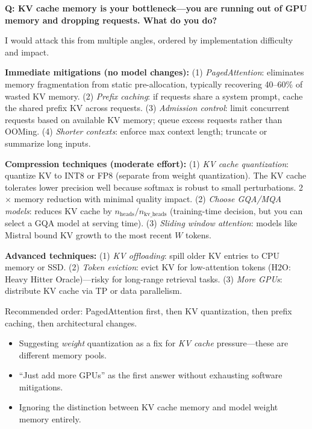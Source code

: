 \begin{interviewq}
\textbf{Q: KV cache memory is your bottleneck---you are running out of GPU memory and dropping requests. What do you do?}

 \quad {} \quad \badgefreq{\freqhigh}

\stronganswer

I would attack this from multiple angles, ordered by implementation difficulty and impact.

\textbf{Immediate mitigations (no model changes):} (1) \textit{PagedAttention}: eliminates memory fragmentation from static pre-allocation, typically recovering 40--60\% of wasted KV memory. (2) \textit{Prefix caching}: if requests share a system prompt, cache the shared prefix KV across requests. (3) \textit{Admission control}: limit concurrent requests based on available KV memory; queue excess requests rather than OOMing. (4) \textit{Shorter contexts}: enforce max context length; truncate or summarize long inputs.

\textbf{Compression techniques (moderate effort):} (1) \textit{KV cache quantization}: quantize KV to INT8 or FP8 (separate from weight quantization). The KV cache tolerates lower precision well because softmax is robust to small perturbations. 2$\times$ memory reduction with minimal quality impact. (2) \textit{Choose GQA/MQA models}: reduces KV cache by $n_{\text{heads}} / n_{\text{kv\_heads}}$ (training-time decision, but you can select a GQA model at serving time). (3) \textit{Sliding window attention}: models like Mistral bound KV growth to the most recent $W$ tokens.

\textbf{Advanced techniques:} (1) \textit{KV offloading}: spill older KV entries to CPU memory or SSD. (2) \textit{Token eviction}: evict KV for low-attention tokens (H2O: Heavy Hitter Oracle)---risky for long-range retrieval tasks. (3) \textit{More GPUs}: distribute KV cache via TP or data parallelism.

Recommended order: PagedAttention first, then KV quantization, then prefix caching, then architectural changes.

\redflags
\begin{itemize}
    \item Suggesting \textit{weight} quantization as a fix for \textit{KV cache} pressure---these are different memory pools.
    \item ``Just add more GPUs'' as the first answer without exhausting software mitigations.
    \item Ignoring the distinction between KV cache memory and model weight memory entirely.
\end{itemize}


\end{interviewq}
